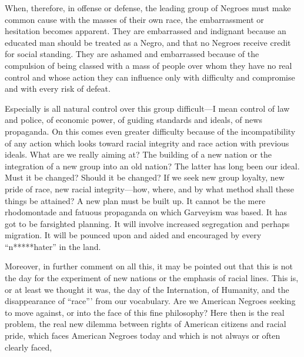 \documentclass[letterpaper,10pt,english]{jupyterBook}
\begin{document}
\sphinxAtStartPar
When, therefore, in offense or defense, the leading group of Negroes must make common cause with the masses of their own race, the embarrassment or hesitation becomes apparent. They are embarrassed and indignant because an educated man should be treated as a Negro, and that no Negroes receive credit for social standing. They are ashamed and embarrassed because of the compulsion of being classed with a mass of people over whom they have no real control and whose action they can influence only with difficulty and compromise and with every risk of defeat.

\sphinxAtStartPar
Especially is all natural control over this group difficult—I mean control of law and police, of economic power, of guiding standards and ideals, of news propaganda. On this comes even greater difficulty because of the incompatibility of any action which looks toward racial integrity and race action with previous ideals. What are we really aiming at? The building of a new nation or the integration of a new group into an old nation? The latter has long been our ideal. Must it be changed? Should it be changed? If we seek new group loyalty, new pride of race, new racial integrity—how, where, and by what method shall these things be attained? A new plan must be built up. It cannot be the mere rhodomontade and fatuous propaganda on which Garveyism was based. It has got to be far\sphinxhyphen{}sighted planning. It will involve increased segregation and perhaps migration. It will be pounced upon and aided and encouraged by every “n*****hater” in the land.

\sphinxAtStartPar
Moreover, in further comment on all this, it may be pointed out that this is not the day for the experiment of new nations or the emphasis of racial lines. This is, or at least we thought it was, the day of the Inter\sphinxhyphen{}nation, of Humanity, and the disappearance of “race”’ from our vocabulary. Are we American Negroes seeking to move against, or into the face of this fine philosophy? Here then is the real problem, the real new dilemma between rights of American citizens and racial pride, which faces American Negroes today and which is not always or often clearly faced,
\end{document}
